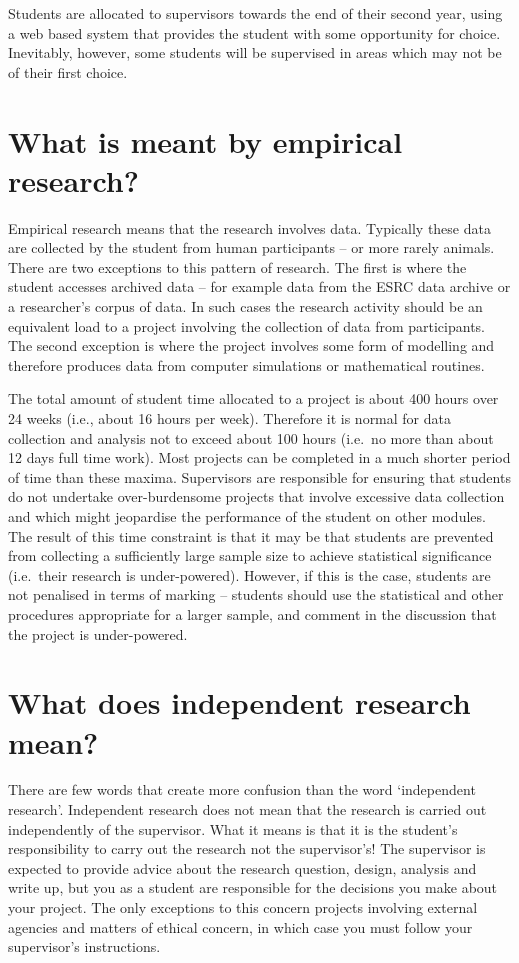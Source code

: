 \documentclass[
]{book}
\begin{document}
Students are allocated to supervisors towards the end of their second year, using a web based system that provides the student with some opportunity for choice. Inevitably, however, some students will be supervised in areas which may not be of their first choice.

\section{What is meant by empirical research?}\label{what-is-meant-by-empirical-research}

Empirical research means that the research involves data. Typically these data are collected by the student from human participants -- or more rarely animals. There are two exceptions to this pattern of research. The first is where the student accesses archived data -- for example data from the ESRC data archive or a researcher's corpus of data. In such cases the research activity should be an equivalent load to a project involving the collection of data from participants. The second exception is where the project involves some form of modelling and therefore produces data from computer simulations or mathematical routines.

The total amount of student time allocated to a project is about 400 hours over 24 weeks (i.e., about 16 hours per week). Therefore it is normal for data collection and analysis not to exceed about 100 hours (i.e.~no more than about 12 days full time work). Most projects can be completed in a much shorter period of time than these maxima. Supervisors are responsible for ensuring that students do not undertake over-burdensome projects that involve excessive data collection and which might jeopardise the performance of the student on other modules. The result of this time constraint is that it may be that students are prevented from collecting a sufficiently large sample size to achieve statistical significance (i.e.~their research is under-powered). However, if this is the case, students are not penalised in terms of marking -- students should use the statistical and other procedures appropriate for a larger sample, and comment in the discussion that the project is under-powered.

\section{What does independent research mean?}\label{what-does-independent-research-mean}

There are few words that create more confusion than the word `independent research'. Independent research does not mean that the research is carried out independently of the supervisor. What it means is that it is the student's responsibility to carry out the research not the supervisor's! The supervisor is expected to provide advice about the research question, design, analysis and write up, but you as a student are responsible for the decisions you make about your project. The only exceptions to this concern projects involving external agencies and matters of ethical concern, in which case you must follow your supervisor's instructions.
\end{document}
